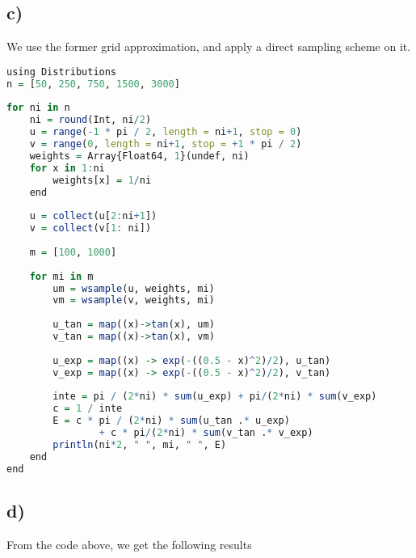 \documentclass[12pt]{article}
\begin{document}
\begin{flushleft}
\subsection*{c)}

\qquad We use the former grid approximation, and apply a direct sampling scheme on it.

\begin{lstlisting}[language=R]
using Distributions
n = [50, 250, 750, 1500, 3000]
        
for ni in n
    ni = round(Int, ni/2)
    u = range(-1 * pi / 2, length = ni+1, stop = 0)
    v = range(0, length = ni+1, stop = +1 * pi / 2)
    weights = Array{Float64, 1}(undef, ni)
    for x in 1:ni
        weights[x] = 1/ni
    end
            
    u = collect(u[2:ni+1])
    v = collect(v[1: ni])
        
    m = [100, 1000]
        
    for mi in m
        um = wsample(u, weights, mi)
        vm = wsample(v, weights, mi)
            
        u_tan = map((x)->tan(x), um)
        v_tan = map((x)->tan(x), vm)
        
        u_exp = map((x) -> exp(-((0.5 - x)^2)/2), u_tan)
        v_exp = map((x) -> exp(-((0.5 - x)^2)/2), v_tan)
        
        inte = pi / (2*ni) * sum(u_exp) + pi/(2*ni) * sum(v_exp)
        c = 1 / inte
        E = c * pi / (2*ni) * sum(u_tan .* u_exp) 
                + c * pi/(2*ni) * sum(v_tan .* v_exp)
        println(ni*2, " ", mi, " ", E)
    end
end
\end{lstlisting}

\subsection*{d)}

\qquad From the code above, we get the following results


\end{flushleft}
\end{document}
